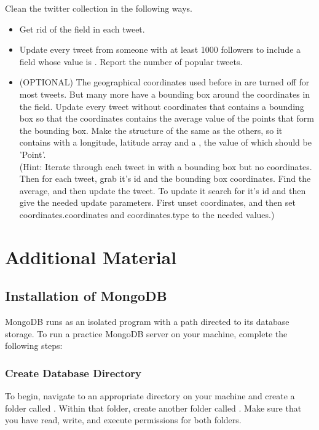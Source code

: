 \begin{problem}
Clean the twitter collection in the following ways.
\begin{itemize}
\item Get rid of the  field in each tweet.

\item Update every tweet from someone with at least 1000 followers to include a  field whose value is .
Report the number of popular tweets.

\item (OPTIONAL) The geographical coordinates used before in  are turned off for most tweets. But many more have a bounding box around the coordinates in the  field. Update every tweet without coordinates that contains a bounding box so that the coordinates contains the average value of the points that form the bounding box. Make the structure of  the same as the others, so it contains  with a longitude, latitude array and a , the value of which should be 'Point'.
\\(Hint: Iterate through each tweet in with a bounding box but no coordinates. Then for each tweet, grab it's id and the bounding box coordinates. Find the average, and then update the tweet. To update it search for it's id and then give the needed update parameters. First unset coordinates, and then set coordinates.coordinates and coordinates.type to the needed values.)
\end{itemize}
\end{problem}

\newpage

\section*{Additional Material} %

\subsection*{Installation of MongoDB}

MongoDB runs as an isolated program with a path directed to its database storage.
To run a practice MongoDB server on your machine, complete the following steps:

\subsubsection*{Create Database Directory}
To begin, navigate to an appropriate directory on your machine and create a folder called .
Within that folder, create another folder called .
Make sure that you have read, write, and execute permissions for both folders.

